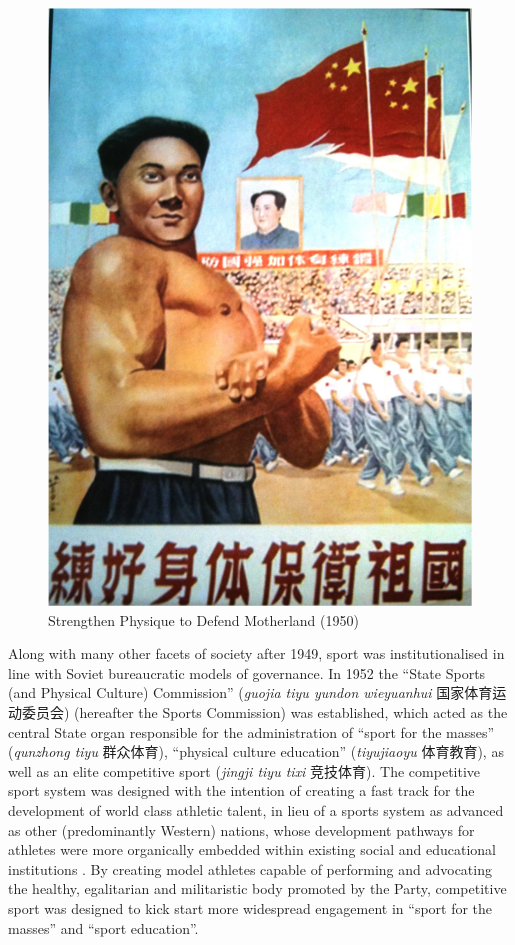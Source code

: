 \begin{CJK}{UTF8}{gbsn}
    \begin{figure}[htbp]
      \includegraphics[width = \linewidth,scale=.7]{images/motherlandStrength.png}
      \caption{Strengthen Physique to Defend Motherland (1950)}
      \label{fig:motherlandStrength}
    \end{figure}

Along with many other facets of society after 1949, sport was institutionalised in line with Soviet bureaucratic models of governance.  In 1952 the ``State Sports (and Physical Culture) Commission'' (\textit{guojia tiyu yundon wieyuanhui} 国家体育运动委员会) (hereafter the Sports Commission) was established, which acted as the central State organ responsible for the administration of ``sport for the masses'' (\textit{qunzhong tiyu} 群众体育), ``physical culture education'' (\textit{tiyujiaoyu} 体育教育), as well as an elite competitive sport (\textit{jingji tiyu tixi} 竞技体育).  The competitive sport system was designed with the intention of creating a fast track for the development of world class athletic talent, in lieu of a sports system as advanced as other (predominantly Western) nations, whose development pathways for athletes were more organically embedded within existing social and educational institutions \citep{Brownell2008}.  By creating model athletes capable of performing and advocating the healthy, egalitarian and militaristic body promoted by the Party, competitive sport was designed to kick start more widespread engagement in ``sport for the masses'' and ``sport education''\citep[56]{Brownell1995}.


\end{CJK}
